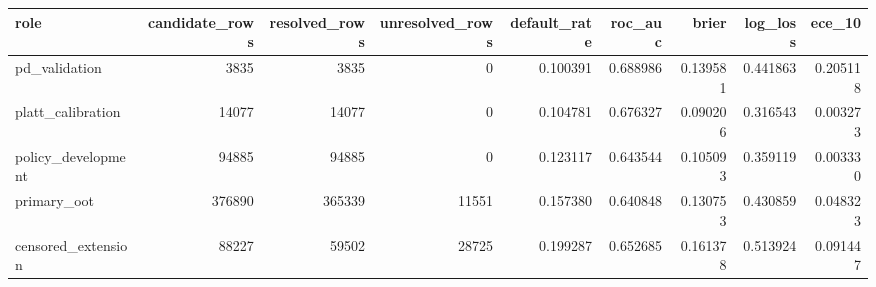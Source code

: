 \begin{tabular}{lrrrrrrrr}
\toprule
role & candidate\_rows & resolved\_rows & unresolved\_rows & default\_rate & roc\_auc & brier & log\_loss & ece\_10 \\
\midrule
pd\_validation & 3835 & 3835 & 0 & 0.100391 & 0.688986 & 0.139581 & 0.441863 & 0.205118 \\
platt\_calibration & 14077 & 14077 & 0 & 0.104781 & 0.676327 & 0.090206 & 0.316543 & 0.003273 \\
policy\_development & 94885 & 94885 & 0 & 0.123117 & 0.643544 & 0.105093 & 0.359119 & 0.003330 \\
primary\_oot & 376890 & 365339 & 11551 & 0.157380 & 0.640848 & 0.130753 & 0.430859 & 0.048323 \\
censored\_extension & 88227 & 59502 & 28725 & 0.199287 & 0.652685 & 0.161378 & 0.513924 & 0.091447 \\
\bottomrule
\end{tabular}

